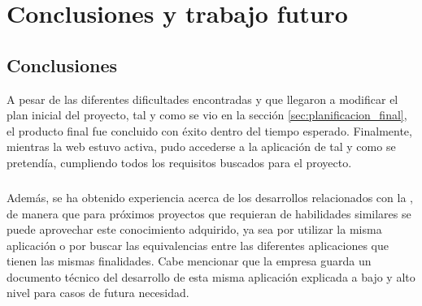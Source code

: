 \documentclass{subfiles}
\begin{document}
    \chapter{Conclusiones y trabajo futuro}
    \label{chap:conclusiones_y_futuros_pasos}

    \section{Conclusiones}
    \label{sec:conclusiones}
    A pesar de las diferentes dificultades encontradas y que llegaron a modificar el plan inicial del proyecto, tal y como se vio en la sección \ref{sec:planificacion_final}, el producto final fue concluido con éxito dentro del tiempo esperado. Finalmente, mientras la web estuvo activa, pudo accederse a la aplicación de \ra tal y como se pretendía, cumpliendo todos los requisitos buscados para el proyecto.

    \paragraph{}
    Además, se ha obtenido experiencia acerca de los desarrollos relacionados con la \ra, de manera que para próximos proyectos que requieran de habilidades similares se puede aprovechar este conocimiento adquirido, ya sea por utilizar la misma aplicación o por buscar las equivalencias entre las diferentes aplicaciones que tienen las mismas finalidades. Cabe mencionar que la empresa guarda un documento técnico del desarrollo de esta misma aplicación explicada a bajo y alto nivel para casos de futura necesidad.
\end{document}
